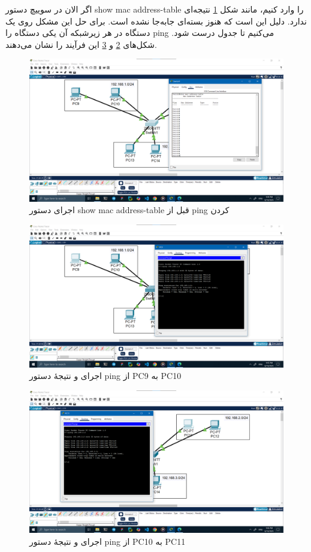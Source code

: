 \documentclass[12pt]{article}
\begin{document}
	اگر الان در سوییچ دستور \textenglish{show mac address-table} را وارد کنیم، مانند شکل \ref{img:17} نتیجه‌ای ندارد. دلیل این است که هنوز بسته‌ای جا‌به‌جا نشده است. برای حل این مشکل روی یک دستگاه در هر زیرشبکه آن یکی دستگاه را  \textenglish{ping} می‌کنیم تا جدول درست شود.  شکل‌های \ref{img:18} و \ref{img:19} این فرآیند را نشان می‌دهند.
	\begin{figure}[H]
		\centering
		\includegraphics[width=\textwidth]{resources/17.png}
		\caption{اجرای دستور \textenglish{show mac address-table} قبل از \textenglish{ping} کردن}
		\label{img:17}
	\end{figure}
	\begin{figure}[H]
		\centering
		\includegraphics[width=\textwidth]{resources/18.png}
		\caption{اجرای و نتیجهٔ دستور \textenglish{ping} از \textenglish{PC9} به \textenglish{PC10}}
		\label{img:18}
	\end{figure}
	\begin{figure}[H]
		\centering
		\includegraphics[width=\textwidth]{resources/19.png}
		\caption{اجرای و نتیجهٔ دستور \textenglish{ping} از \textenglish{PC10} به \textenglish{PC11}}
		\label{img:19}
	\end{figure}
\end{document}
